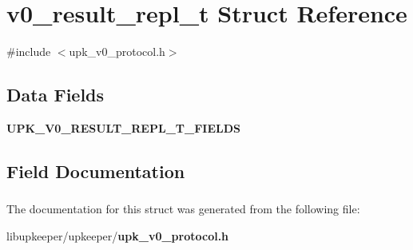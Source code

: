 \section{v0\_\-result\_\-repl\_\-t Struct Reference}
\label{structv0__result__repl__t}


{\ttfamily \#include $<$upk\_\-v0\_\-protocol.h$>$}

\subsection*{Data Fields}
\begin{DoxyCompactItemize}
\item 
{\bf UPK\_\-V0\_\-RESULT\_\-REPL\_\-T\_\-FIELDS}
\end{DoxyCompactItemize}


\subsection{Field Documentation}
\subsubsection[{UPK\_\-V0\_\-RESULT\_\-REPL\_\-T\_\-FIELDS}]{}\label{structv0__result__repl__t_ad1829da10b8004d20fcc66dd4e2143b6}


The documentation for this struct was generated from the following file:\begin{DoxyCompactItemize}
\item 
libupkeeper/upkeeper/{\bf upk\_\-v0\_\-protocol.h}\end{DoxyCompactItemize}
